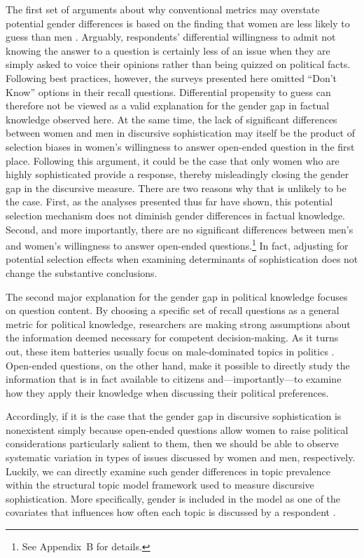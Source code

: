 The first set of arguments about why conventional metrics may overstate potential gender differences is based on the finding that women are less likely to guess than men \citep{mondak2004knowledge}. Arguably, respondents' differential willingness to admit not knowing the answer to a question is certainly less of an issue when they are simply asked to voice their opinions rather than being quizzed on political facts. Following best practices, however, the surveys presented here omitted ``Don't Know'' options in their recall questions. Differential propensity to guess can therefore not be viewed as a valid explanation for the gender gap in factual knowledge observed here. At the same time, the lack of significant differences between women and men in discursive sophistication may itself be the product of selection biases in women's willingness to answer open-ended question in the first place. Following this argument, it could be the case that only women who are highly sophisticated provide a response, thereby misleadingly closing the gender gap in the discursive measure. There are two reasons why that is unlikely to be the case. First, as the analyses presented thus far have shown, this potential selection mechanism does not diminish gender differences in factual knowledge. Second, and more importantly, there are no significant differences between men's and women's willingness to answer open-ended questions.\footnote{See Appendix~B for details.} In fact, adjusting for potential selection effects when examining determinants of sophistication does not change the substantive conclusions.


The second major explanation for the gender gap in political knowledge focuses on question content. By choosing a specific set of recall questions as a general metric for political knowledge, researchers are making strong assumptions about the information deemed necessary for competent decision-making. As it turns out, these item batteries usually focus on male-dominated topics in politics \citep{dolan2011women}. Open-ended questions, on the other hand, make it possible to directly study the information that is in fact available to citizens and---importantly---to examine how they apply their knowledge when discussing their political preferences.

Accordingly, if it is the case that the gender gap in discursive sophistication is nonexistent simply because open-ended questions allow women to raise political considerations particularly salient to them, then we should be able to observe systematic variation in types of issues discussed by women and men, respectively. Luckily, we can directly examine such gender differences in topic prevalence within the structural topic model framework used to measure discursive sophistication. More specifically, gender is included in the model as one of the covariates that influences how often each topic is discussed by a respondent \citep[see also][for details]{roberts2014structural}.

